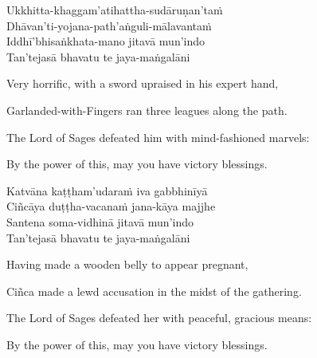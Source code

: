 \begin{pali-hang-continued}
  Ukkhitta-khaggam'atihattha-sudāruṇan'taṁ\\
  Dhāvan'ti-yojana-path'aṅguli-mālavantaṁ\\
  Iddhī'bhisaṅkhata-mano jitavā mun'indo\\
  Tan'tejasā bhavatu te jaya-maṅgalāni
\end{pali-hang-continued}

\ifninebythirteen\clearpage\fi

\begin{english-verses}
  Very horrific, with a sword upraised in his expert hand,\\
  \begin{english-hang-together-verses}
  Garlanded-with-Fingers ran three leagues along the path.\\
  \end{english-hang-together-verses}
  \begin{english-hang-together-verses}
  The Lord of Sages defeated him with mind-fashioned marvels:\\
  \end{english-hang-together-verses}
  \begin{english-hang-together-verses}
  By the power of this, may you have victory blessings.
  \end{english-hang-together-verses}
\end{english-verses}

\begin{pali-hang-continued}
  Katvāna kaṭṭham'udaraṁ iva gabbhinīyā\\
  Ciñcāya duṭṭha-vacanaṁ jana-kāya majjhe\\
  Santena soma-vidhinā jitavā mun'indo\\
  Tan'tejasā bhavatu te jaya-maṅgalāni
\end{pali-hang-continued}

\begin{english-verses}
  Having made a wooden belly to appear pregnant,\\
  \begin{english-hang-together-verses}
  Ciñca made a lewd accusation in the midst of the gathering.\\
  \end{english-hang-together-verses}
  \begin{english-hang-together-verses}
  The Lord of Sages defeated her with peaceful, gracious means:\\
  \end{english-hang-together-verses}
  \begin{english-hang-together-verses}
  By the power of this, may you have victory blessings.
  \end{english-hang-together-verses}
\end{english-verses}

